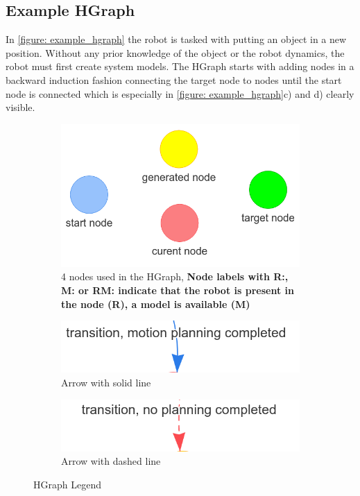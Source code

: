 \subsection{Example HGraph}
In \cref{figure: example_hgraph} the robot is tasked with putting an object in a new position. Without any prior knowledge of the object or the robot dynamics, the robot must first create system models. The HGraph starts with adding nodes in a backward induction fashion connecting the target node to nodes until the start node is connected which is especially in \cref{figure: example_hgraph}c) and d) clearly visible. 

\begin{figure}[H]
     \centering
     \begin{subfigure}[b]{0.5\textwidth}
         \centering
         \includegraphics[width=\textwidth]{figures/hgraph_legend_nodes.png}
         \caption{4 nodes used in the HGraph, \textbf{\large Node labels with R:, M: or RM: indicate that the robot is present in the node (R), a model is available (M)}}
     \end{subfigure}
     
     \begin{subfigure}[b]{0.49\textwidth}
         \centering
         \includegraphics[width=\textwidth]{figures/hgraph_legend_transition1.png}
         \caption{Arrow with solid line}
     \end{subfigure}
    \hfill 
    \begin{subfigure}[b]{0.49\textwidth}
         \centering
         \includegraphics[width=\textwidth]{figures/hgraph_legend_transition2.png}
         \caption{Arrow with dashed line}
     \end{subfigure}
   \caption{HGraph Legend}
    \label{figure: hgraph_legend}
\end{figure}

